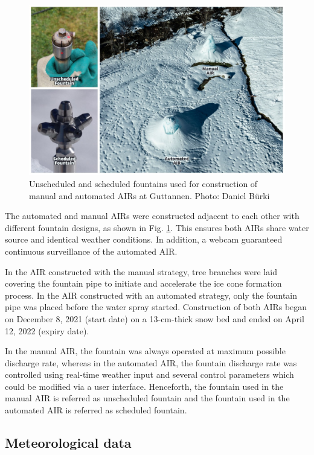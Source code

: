 \documentclass[tc, manuscript]{copernicus}
\begin{document}
\begin{figure}[htb]
\includegraphics[width=12cm]{Figures/AIR_fountains.jpg}
\caption{Unscheduled and scheduled fountains used for construction of manual and automated AIRs at
  Guttannen. Photo: Daniel Bürki}
\label{fig:2AIR}
\end{figure}

The automated and manual AIRs were constructed adjacent to each other with different fountain
designs, as shown in Fig. \ref{fig:2AIR}. This ensures both AIRs share water source and identical
weather conditions. In addition, a webcam guaranteed continuous surveillance of the automated AIR.   

In the AIR constructed with the manual strategy, tree branches were laid covering the fountain pipe to
initiate and accelerate the ice cone formation process. In the AIR constructed with an automated strategy, only
the fountain pipe was placed before the water spray started. Construction of both AIRs began on December 8, 2021
(start date) on a 13-cm-thick snow bed and ended on April 12, 2022 (expiry date).

In the manual AIR, the fountain was always operated at maximum possible discharge rate, whereas in the automated
AIR, the fountain discharge rate was controlled using real-time weather input and several control parameters
which could be modified via a user interface. Henceforth, the fountain used in the manual AIR is referred as
unscheduled fountain and the fountain used in the automated AIR is referred as scheduled fountain.

\subsection{Meteorological data}
\end{document}
